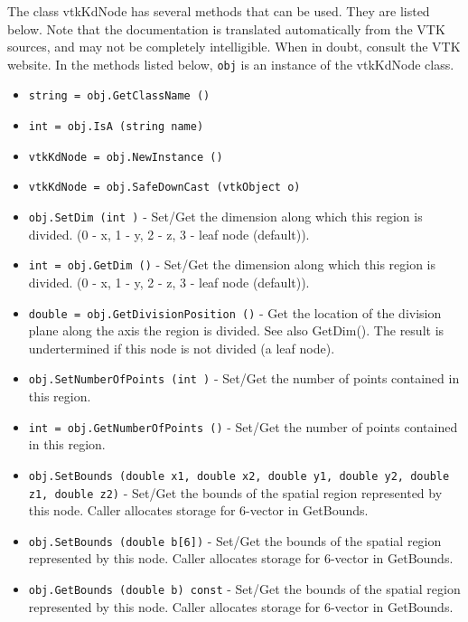 The class vtkKdNode has several methods that can be used.
  They are listed below.
Note that the documentation is translated automatically from the VTK sources,
and may not be completely intelligible.  When in doubt, consult the VTK website.
In the methods listed below, \verb|obj| is an instance of the vtkKdNode class.
\begin{itemize}
\item  \verb|string = obj.GetClassName ()|

\item  \verb|int = obj.IsA (string name)|

\item  \verb|vtkKdNode = obj.NewInstance ()|

\item  \verb|vtkKdNode = obj.SafeDownCast (vtkObject o)|

\item  \verb|obj.SetDim (int )| -  Set/Get the dimension along which this region is divided.
 (0 - x, 1 - y, 2 - z, 3 - leaf node (default)).

\item  \verb|int = obj.GetDim ()| -  Set/Get the dimension along which this region is divided.
 (0 - x, 1 - y, 2 - z, 3 - leaf node (default)).

\item  \verb|double = obj.GetDivisionPosition ()| -  Get the location of the division plane along the axis the region
 is divided.  See also GetDim().  The result is undertermined if
 this node is not divided (a leaf node).

\item  \verb|obj.SetNumberOfPoints (int )| -  Set/Get the number of points contained in this region.

\item  \verb|int = obj.GetNumberOfPoints ()| -  Set/Get the number of points contained in this region.

\item  \verb|obj.SetBounds (double x1, double x2, double y1, double y2, double z1, double z2)| -    Set/Get the bounds of the spatial region represented by this node.
   Caller allocates storage for 6-vector in GetBounds.

\item  \verb|obj.SetBounds (double b[6])| -    Set/Get the bounds of the spatial region represented by this node.
   Caller allocates storage for 6-vector in GetBounds.

\item  \verb|obj.GetBounds (double b) const| -    Set/Get the bounds of the spatial region represented by this node.
   Caller allocates storage for 6-vector in GetBounds.


\end{itemize}
